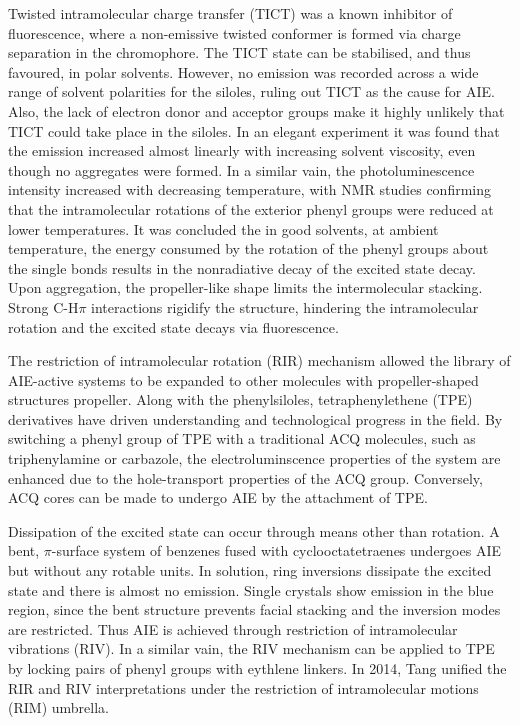 Twisted intramolecular charge transfer (TICT) was a known inhibitor of fluorescence, where a non-emissive twisted conformer is formed via charge separation in the chromophore. The TICT state can be stabilised, and thus favoured, in polar solvents. However, no emission was recorded across a wide range of solvent polarities for the siloles, ruling out TICT as the cause for AIE. Also, the lack of electron donor and acceptor groups make it highly unlikely that TICT could take place in the siloles. In an elegant experiment it was found that the emission increased almost linearly with increasing solvent viscosity, even though no aggregates were formed. In a similar vain, the photoluminescence intensity increased with decreasing temperature, with NMR studies confirming that the intramolecular rotations of the exterior phenyl groups were reduced at lower temperatures. It was concluded the in good solvents, at ambient temperature, the energy consumed by the rotation of the phenyl groups about the single bonds results in the nonradiative decay of the excited state decay. Upon aggregation, the propeller-like shape limits the intermolecular stacking. Strong C-H\textperiodcentered\textperiodcentered\textperiodcentered$\pi$ interactions rigidify the structure, hindering the intramolecular rotation and the excited state decays via fluorescence.\cite{Chen2003}

The restriction of intramolecular rotation (RIR) mechanism allowed the library of AIE-active systems to be expanded to other molecules with propeller-shaped structures propeller.  Along with the phenylsiloles, tetraphenylethene (TPE)  derivatives have driven understanding and technological progress in the field.\cite{Hong2009,Wang2010a,Hong2011,Mei2014,Hu2014,Mei2015} By switching a phenyl group of TPE with a traditional ACQ molecules, such as triphenylamine or carbazole, the electroluminscence properties of the system are enhanced due to the hole-transport properties of the ACQ group.\cite{Chan2014} Conversely, ACQ cores can be made to undergo AIE by the attachment of TPE.\cite{Yuan2010a}

Dissipation of the excited state can occur through means other than rotation. A bent, $\pi$-surface system of benzenes fused with cyclooctatetraenes undergoes AIE but without any rotable units.\cite{Nishiuchi2013} In solution, ring inversions dissipate the excited state and there is almost no emission. Single crystals show emission in the blue region, since the bent structure prevents facial stacking and the inversion modes are restricted. Thus AIE is achieved through restriction of intramolecular vibrations (RIV). In a similar vain, the RIV mechanism can be applied to TPE by locking pairs of phenyl groups with eythlene linkers. In 2014, Tang unified the RIR and RIV interpretations under the restriction of intramolecular motions (RIM) umbrella.\cite{Leung2014}

